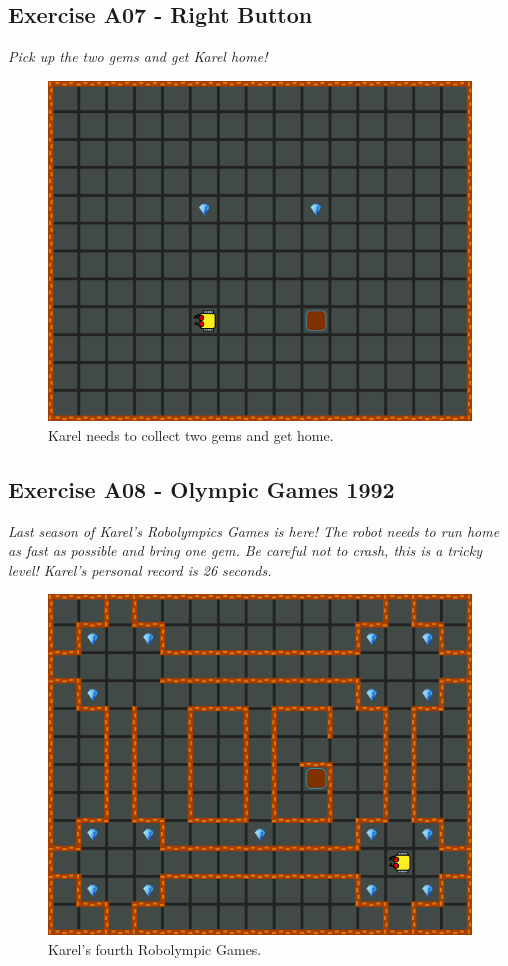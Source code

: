 \documentclass[article,A4,12pt]{llncs}
\begin{document}
\subsection{Exercise A07 - Right Button}

{\em Pick up the two gems and get Karel home!}

\begin{figure}[!ht]
\begin{center}
\includegraphics[height=0.4\textwidth]{img/a07.png}
\end{center}
\vspace{-4mm}
\caption{Karel needs to collect two gems and get home.}
\label{fig:a07}
\vspace{-1cm}
\end{figure}
\noindent
\newpage

\subsection{Exercise A08 - Olympic Games 1992}

{\em Last season of Karel's Robolympics Games is here! The 
robot needs to run home as fast as possible and bring one gem. 
Be careful not to crash, this is a tricky level! Karel's personal record is 26 seconds.}\\[-7mm]

\begin{figure}[!ht]
\begin{center}
\includegraphics[height=0.4\textwidth]{img/a08.png}
\end{center}
\vspace{-4mm}
\caption{Karel's fourth Robolympic Games.}
\label{fig:a08}
\vspace{-4mm}
\end{figure}
\noindent
\end{document}
